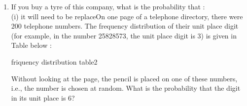 \renewcommand{\theequation}{\theenumi}
\begin{enumerate}[label=\arabic*.,ref=\thesubsection.\theenumi]
\item If you buy a tyre of this company, what is the probability that :\\
(i) it will need to be replaceOn one page of a telephone directory, there were 200 telephone numbers.
The frequency distribution of their unit place digit (for example, in the number 25828573, the unit place digit is 3) is given in Table below :\\

\begin{table}[!ht]
	\centering
	
	\caption{friquency distribution table2 }
\end{table}


Without looking at the page, the pencil is placed on one of these numbers, i.e., the number is chosen at random. What is the probability that the digit in its unit place is 6?
\end{enumerate}